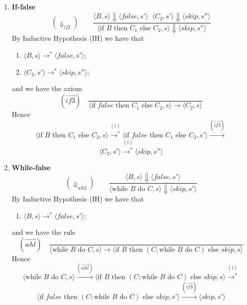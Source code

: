 \begin{solution}
\begin{enumerate}[label=(\alph*)]
\begin{enumerate}[label=(\alph{enumi}).\arabic*]
Hence 
\[\langle \text{if }B \text{ then }C_1 \text{ else }C_2, s\rangle \overset{(i)}{\to^*}\langle \text{if }true \text{ then }C_1 \text{ else }C_2, s'\rangle \overset{(\overset{\rightarrow}{if2})}{\to}\]
\[\langle C_1, s' \rangle \overset{(i)}{\to^*}\langle skip, s''\rangle \]
\item \textbf{If-false}
 \[ (\Downarrow_{if2}) \quad  \quad \frac{\langle B,s\rangle \Downarrow\langle false, s' \rangle \; \; \langle C_2, s' \rangle \Downarrow\langle skip, s''\rangle}{\langle \text{if }B \text{ then }C_1 \text{ else }C_2, s\rangle \Downarrow\langle skip, s''\rangle}\]
By Inductive Hypothesis (IH) we have that 
 \begin{enumerate}[label=(\roman*)]
     \item $\langle B,s\rangle \to^*\langle false, s' \rangle$;
     \item $\langle C_2, s' \rangle \to^*\langle skip, s''\rangle$;
 \end{enumerate}
 and we have the axiom
     \[ (\overset{\rightarrow}{if3}) \quad \frac{}{\langle \text{if }false \text{ then }C_1 \text{ else }C_2, s\rangle \to \langle C_2,s\rangle}\]
Hence 
\[\langle \text{if }B \text{ then }C_1 \text{ else }C_2, s\rangle \overset{(i)}{\to^*}\langle \text{if }false \text{ then }C_1 \text{ else }C_2, s'\rangle \overset{(\overset{\rightarrow}{if3})}{\to}\]
\[\langle C_2, s' \rangle \overset{(i)}{\to^*}\langle skip, s''\rangle \]
\item \textbf{While-false}
\[ (\Downarrow_{wh2}) \quad  \quad \frac{\langle B,s\rangle \Downarrow\langle false, s' \rangle }{\langle \text{while }B \text{ do }C, s\rangle \Downarrow\langle skip, s'\rangle}\]
By Inductive Hypothesis (IH) we have that 
 \begin{enumerate}[label=(\roman*)]
     \item $\langle B,s\rangle \to^*\langle false, s' \rangle$;
 \end{enumerate}
 and we have the rule
     \[ (\overset{\rightarrow}{whl}) \quad \frac{}{\langle \text{while }B \text{ do }C, s\rangle \to \langle \text{if }B \text{ then }(C; \text{while }B \text{ do }C)\text{ else }skip, s\rangle}\]
Hence 
\[\langle \text{while }B \text{ do }C, s\rangle \overset{(\overset{\rightarrow}{whl})}{\to} \langle \text{if }B \text{ then }(C; \text{while }B \text{ do }C)\text{ else }skip, s\rangle \overset{(i)}{\to^*} \]\[\langle \text{if }false \text{ then }(C; \text{while }B \text{ do }C)\text{ else }skip, s'\rangle \overset{(\overset{\rightarrow}{if3})}{\to} \langle skip, s'\rangle\]
\end{enumerate}


\end{enumerate}
\end{solution}
